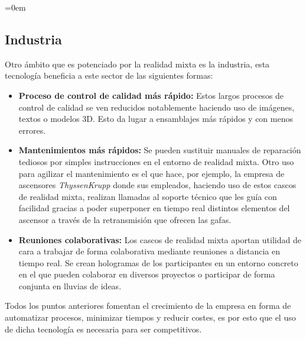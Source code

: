 \parindent=0em
\subsection{Industria}
\noindent




Otro ámbito que es potenciado por la realidad mixta es la industria, esta tecnología beneficia a este sector de las siguientes formas:

\begin{itemize}
    \item \textbf{Proceso de control de calidad más rápido:} Estos largos procesos de control de calidad se ven reducidos notablemente haciendo uso de imágenes, textos o modelos 3D. Esto da lugar a ensamblajes más rápidos y con menos errores.
    
     \item \textbf{Mantenimientos más rápidos:} Se pueden sustituir manuales de reparación tediosos por simples instrucciones en el entorno de realidad mixta. Otro uso para agilizar el mantenimiento es el que hace, por ejemplo, la empresa de ascensores \textit{ThyssenKrupp} donde sus empleados, haciendo uso de estos cascos de realidad mixta, realizan llamadas al soporte técnico que les guía con facilidad gracias a poder superponer en tiempo real distintos elementos del ascensor a través de la retransmisión que ofrecen las gafas.
     
     \item \textbf{Reuniones colaborativas:} Los cascos de realidad mixta aportan utilidad de cara a trabajar de forma colaborativa mediante reuniones a distancia en tiempo real. Se crean hologramas de los participantes en un entorno concreto en el que pueden colaborar en diversos proyectos o participar de forma conjunta en lluvias de ideas.
     
\end{itemize}

 Todos los puntos anteriores fomentan el crecimiento de la empresa en forma de automatizar procesos, minimizar tiempos y reducir costes, es por esto que el uso de dicha tecnología es necesaria para ser competitivos.\\

